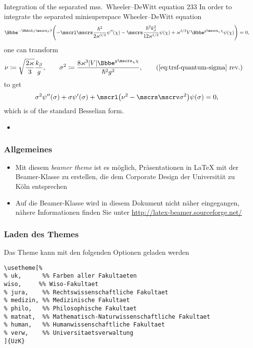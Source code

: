 \documentclass[9pt]{beamer}
\begin{document}
\begin{frame}%
{Integration of the separated mss.\ Wheeler--DeWitt equation}%
{233}
In order to integrate the separated minisuperspace Wheeler--DeWitt equation
\begin{align}
\ee^{-\ii k_\beta\mscrs_\beta\beta}\rbr{
-\mscrl\mscrs\frac{\hslash^2}{2\varkappa^{3/2}}\rfun{\psi''}{\chi}
-\mscrs\frac{\hslash^2k_\beta^2}{12\varkappa^{1/2}}\rfun{\psi}{\chi}
+\varkappa^{3/2}V\ee^{g\mscrs_\chi\chi}\rfun{\psi}{\chi}
} = 0,
\end{align}
one can transform
\begin{align}
\nu &\coloneqq \sqrt{\frac{2\varkappa}{3}}\frac{k_\beta}{g},\qquad
\sigma^2 \coloneqq 
\frac{8\varkappa^3\vbr{V}\ee^{g\mscrs_\chi\chi}}{\hslash^2 g^2},
\tag{\ref{eq:trsf-quantum-sigma} rev.}
\end{align}
to get
\begin{align}
\sigma^2\rfun{\psi''}{\sigma}
+\sigma\rfun{\psi'}{\sigma}
+\mscrl\rbr{\nu^2-\mscrs\mscrv\sigma^2}\rfun{\psi}{\sigma} = 0,
\end{align}
which is of the standard Besselian form.
\end{frame}

\begin{itemize}
\item
\end{itemize}

\begin{frame}
  \frametitle{Allgemeines}

  \begin{itemize}
  \item Mit diesem \emph{beamer theme} ist es möglich, Präsentationen in
    \LaTeX{} mit der Beamer-Klasse zu erstellen, die dem Corporate Design der
    Universität zu Köln entsprechen
  \item Auf die Beamer-Klasse wird in diesem Dokument nicht näher eingegangen,
    nähere Informationen finden Sie unter
    \url{http://latex-beamer.sourceforge.net/}
  \end{itemize}

\end{frame}

\begin{frame}[fragile]
  \frametitle{Laden des Themes}
  \begin{block}{Das Theme kann mit den folgenden Optionen geladen werden}
    \begin{small}
\begin{verbatim}
\usetheme[%
% uk,      %% Farben aller Fakultaeten
wiso,     %% Wiso-Fakultaet
% jura,    %% Rechtswissenschaftliche Fakultaet
% medizin, %% Medizinische Fakultaet
% philo,   %% Philosophische Fakultaet
% matnat,  %% Mathematisch-Naturwissenschaftliche Fakultaet
% human,   %% Humanwissenschaftliche Fakultaet
% verw,    %% Universitaetsverwaltung
]{UzK}
\end{verbatim}
    \end{small}

  \end{block}
\end{frame}
\end{document}
